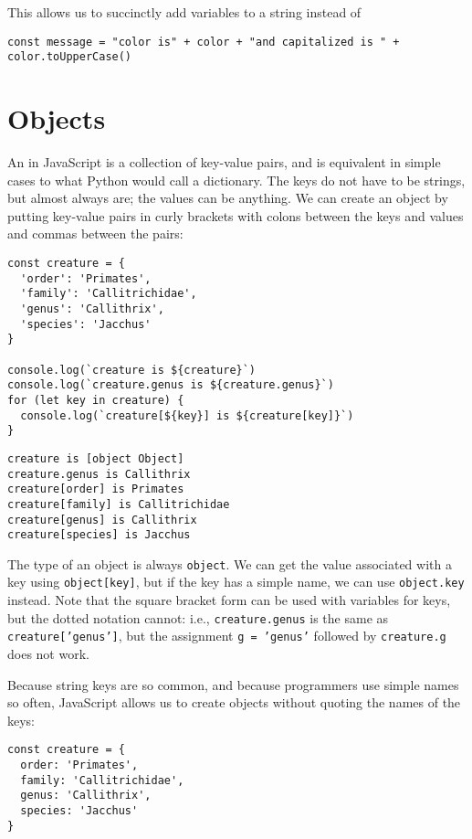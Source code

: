 This allows us to succinctly add variables to a string instead of

\begin{verbatim}
const message = "color is" + color + "and capitalized is " + color.toUpperCase()
\end{verbatim}

\section{Objects}\label{s:basics-objects}

An  in JavaScript is a collection of key-value pairs,
and is equivalent in simple cases to what Python would call a dictionary.
The keys do not have to be strings,
but almost always are;
the values can be anything.
We can create an object by putting key-value pairs in curly brackets
with colons between the keys and values
and commas between the pairs:

\begin{verbatim}
const creature = {
  'order': 'Primates',
  'family': 'Callitrichidae',
  'genus': 'Callithrix',
  'species': 'Jacchus'
}

console.log(`creature is ${creature}`)
console.log(`creature.genus is ${creature.genus}`)
for (let key in creature) {
  console.log(`creature[${key}] is ${creature[key]}`)
}
\end{verbatim}

\begin{verbatim}
creature is [object Object]
creature.genus is Callithrix
creature[order] is Primates
creature[family] is Callitrichidae
creature[genus] is Callithrix
creature[species] is Jacchus
\end{verbatim}

The type of an object is always \texttt{object}.
We can get the value associated with a key using \texttt{object{[}key{]}},
but if the key has a simple name,
we can use \texttt{object.key} instead.
Note that the square bracket form can be used with variables for keys,
but the dotted notation cannot:
i.e.,
\texttt{creature.genus} is the same as \texttt{creature{[}'genus'{]}},
but the assignment \texttt{g\ =\ 'genus'} followed by \texttt{creature.g} does not work.

Because string keys are so common,
and because programmers use simple names so often,
JavaScript allows us to create objects without quoting the names of the keys:

\begin{verbatim}
const creature = {
  order: 'Primates',
  family: 'Callitrichidae',
  genus: 'Callithrix',
  species: 'Jacchus'
}
\end{verbatim}

